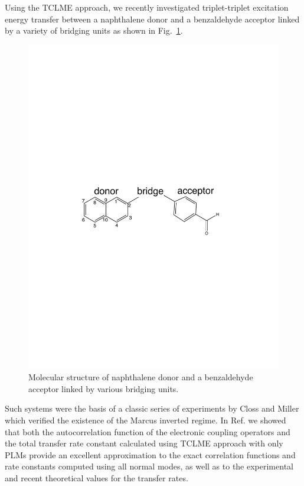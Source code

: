 Using the TCLME approach,  we recently investigated
triplet-triplet excitation energy transfer between a naphthalene donor and a
benzaldehyde acceptor linked by a variety of bridging units as shown in Fig.~\ref{struct}. \cite{yang2014intramolecular}
\begin{figure}
\includegraphics[width=\columnwidth]{Chapters/chap3/molecule1.pdf}
\caption{Molecular structure of naphthalene donor and a
benzaldehyde acceptor linked by various bridging units. }\label{struct}
\end{figure}
Such systems were the basis of a  classic series of experiments by
Closs and Miller\cite{miller1984intramolecular,closs1988determination,closs1989connection}
which verified the existence of the Marcus inverted regime.
In Ref. \cite{yang2014intramolecular} we showed that both
the autocorrelation function of the electronic coupling operators
and the total transfer rate constant calculated using TCLME approach with only PLMs provide an
excellent approximation to the exact correlation functions and rate
constants computed using all normal modes, as well as to the experimental
and recent theoretical values for the transfer rates.\cite{subotnik2010predicting}

